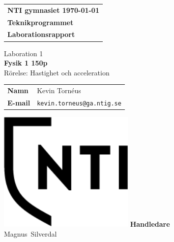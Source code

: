 \documentclass[11p, titlepage, oneside, a4paper]{article}
\makeatletter
\def\inst{Teknikprogrammet}
\def\typeofdoc{Laborationsrapport}
\def\course{Fysik 1 150p}
\def\pretitle{Laboration 1}
\def\title{Rörelse: Hastighet och acceleration}
\def\name{Kevin Tornéus}
\def\username{kevin.torneus}
\def\email{\username{}@ga.ntig.se}
\def\graders{Magnus Silverdal}
\makeatother
\begin{document}
\begin{titlepage}
		\thispagestyle{empty}
		\begin{large}
			\begin{tabular}{@{}p{\textwidth}@{}}
				\textbf{NTI gymnasiet \hfill \today} \\
				\textbf{\inst} \\
				\textbf{\typeofdoc} \\
			\end{tabular}
		\end{large}
		\vspace{10mm}
		\begin{center}
			\LARGE{\pretitle} \\
			\huge{\textbf{\course}}\\
			\vspace{10mm}
			\LARGE{\title} \\
			\vspace{15mm}
			\begin{large}
				\begin{tabular}{ll}
					\textbf{Namn} & \name \\
					\textbf{E-mail} & \texttt{\email} \\
				\end{tabular}
			\end{large}
			\vfill
            \includegraphics[width=0.5\textwidth]{images/NTI Gymnasiet_Symbol_print_svart.png}
			\vfill
            \large{\textbf{Handledare}}\\
			\mbox{\large{\graders}}
		\end{center}
	\end{titlepage}

    \begin{otherlanguage}{english}
	\begin{abstract}
        This lab report goes over how a small trolley moves when it slides down a tilted plane. By using a variety of methods, a chart can be created, thereafter lots of information becomes availible.
    \end{abstract}
    \end{otherlanguage}
	\tableofcontents
	
\end{document}
